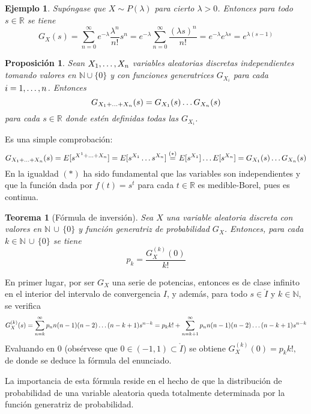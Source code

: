 \documentclass[11pt]{report}
\makeatletter
\renewenvironment{proof}[1][\proofname]{\par
  \pushQED{\qed}%
  \normalfont \topsep\z@skip %
  \trivlist
  \item[\hskip\labelsep
        \itshape
    #1\@addpunct{.}]\ignorespaces
}{%
  \popQED\endtrivlist\@endpefalse
}
\theoremstyle{mytheorem}
\newtheorem{proposition}{Proposición}
\newtheorem{theorem}{Teorema}
\theoremstyle{mydefinition}
\theoremstyle{myexample}
\newtheorem*{example}{Ejemplo}
\let\oldproofname=\proofname
\renewcommand{\proofname}{\rm\bf{\oldproofname}}}
\newenvironment{ctheorem} %
  {\begin{mdframed}[
        linewidth=3pt,
        linecolor=c2,
        bottomline=false,
        topline=false,
        rightline=false,
        innerrightmargin=0pt,
        innertopmargin=0pt,
        innerbottommargin=0pt,
        innerleftmargin=1em,
        skipabove=\baselineskip]
    \begin{theorem}}
  {\end{theorem}\end{mdframed}}
\newenvironment{cproposition} %
  {\begin{mdframed}[
        linewidth=3pt,
        linecolor=c2,
        bottomline=false,
        topline=false,
        rightline=false,
        innerrightmargin=0pt,
        innertopmargin=0pt,
        innerbottommargin=0pt,
        innerleftmargin=1em,
        skipabove=\baselineskip]
    \begin{proposition}}
  {\end{proposition}\end{mdframed}}
\newcommand{\R}{\mathbb R}
\newcommand{\N}{\mathbb N}
\makeatother
\begin{document}
\begin{example}
Supóngase que $X \sim P(\lambda)$ para cierto $\lambda>0$. Entonces para todo $s \in \R$ se tiene
\[G_X(s) = \sum_{n=0}^\infty e^{-\lambda}\frac{\lambda^n}{n!}s^n = e^{-\lambda}\sum_{n= 0}^\infty \frac{(\lambda s)^n}{n!} = e^{-\lambda} e^{\lambda s} = e^{\lambda(s-1)}\]
\end{example}

\begin{cproposition}
Sean $X_1,\mathellipsis,X_n$ variables aleatorias discretas independientes tomando valores en $\N \cup \{0\}$ y con funciones generatrices $G_{X_i}$ para cada $i = 1,\mathellipsis,n$. Entonces
\[G_{X_1+\mathellipsis+X_n}(s) = G_{X_1}(s) \mathellipsis G_{X_n}(s)\]
para cada $s \in \R$ donde estén definidas todas las $G_{X_i}$.
\end{cproposition}

\begin{proof}
Es una simple comprobación:
\[G_{X_1+\mathellipsis+X_n}(s) = E[s^{X^1+\mathellipsis+X_n}] = E[s^{X_1}\mathellipsis s^{X_n}] \overset{(*)}{=} E[s^{X_1}]\mathellipsis E[s^{X_n}] = G_{X_1}(s) \mathellipsis G_{X_n}(s)\]
En la igualdad $(*)$ ha sido fundamental que las variables son independientes y que la función dada por $f(t) = s^t$ para cada $t \in \R$ es medible-Borel, pues es continua.
\end{proof}

\begin{ctheorem}[{Fórmula de inversión}]
Sea $X$ una variable aleatoria discreta con valores en $\N \, \cup \, \{0\}$ y función generatriz de probabilidad $G_X$. Entonces, para cada $k \in \N \, \cup \, \{0\}$ se tiene
\[p_k = \frac{G^{(k)}_X(0)}{k!}\]
\end{ctheorem}
\begin{proof}
En primer lugar, por ser $G_X$ una serie de potencias, entonces es de clase infinito en el interior del intervalo de convergencia $I$, y además, para todo $s \in \mathring{I}$ y $k \in \N$, se verifica
\[G_X^{(k)}(s) = \sum_{n=k}^\infty p_nn(n-1)(n-2)\mathellipsis (n-k+1)s^{n-k} = p_kk! +\sum_{n=k+1}^\infty p_nn(n-1)(n-2)\mathellipsis (n-k+1)s^{n-k}\]
Evaluando en $0$ (obsérvese que $0 \in (-1,1) \subset \mathring{I}$) se obtiene $G^{(k)}_X(0) = p_k k!,$ de donde se deduce la fórmula del enunciado.
\end{proof}

La importancia de esta fórmula reside en el hecho de que la distribución de probabilidad de una variable aleatoria queda totalmente determinada por la función generatriz de probabilidad.
\end{document}
